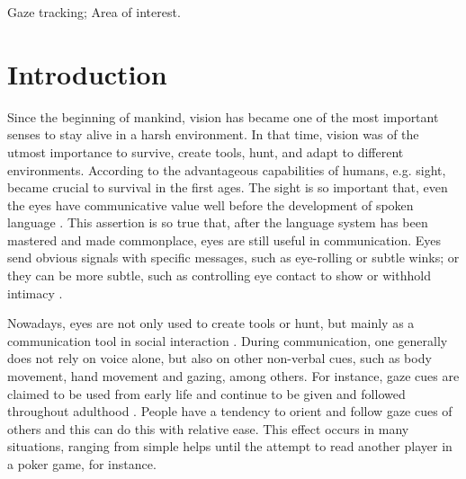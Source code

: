 \documentclass[10pt, conference]{IEEEtran}
\begin{document}
\begin{IEEEkeywords}
	Gaze tracking; Area of interest.
\end{IEEEkeywords}


\IEEEpeerreviewmaketitle

\section{Introduction}
	Since the beginning of mankind, vision has became one of the most important senses to stay alive in a harsh environment. 
	In that time, vision was of the utmost importance to survive, create tools, hunt, and adapt to different environments. 
	According to \cite{1} the advantageous capabilities of humans, e.g. sight, became crucial to survival in the first ages.
	The sight is so important that, even the eyes have communicative value well before the development of spoken language \cite{2}.
	This assertion is so true that, after the language system has been mastered and made commonplace, eyes are still useful in communication. 
	Eyes send obvious signals with specific messages, such as eye-rolling or subtle winks; or they can be more subtle, such as controlling eye contact to show or withhold intimacy \cite{3}.

	Nowadays, eyes are not only used to create tools or hunt, but mainly as a communication tool in social interaction \cite{4}.
	During communication, one generally does not rely on voice alone, but also on other non-verbal cues, such as body movement, hand movement and gazing, among others.
	For instance, gaze cues are claimed to be used from early life and continue to be given and followed throughout adulthood \cite{4}.
	People have a tendency to orient and follow gaze cues of others and this can do this with relative ease. 
	This effect occurs in many situations, ranging from simple helps until the attempt to read another player in a poker game, for instance.
\end{document}
